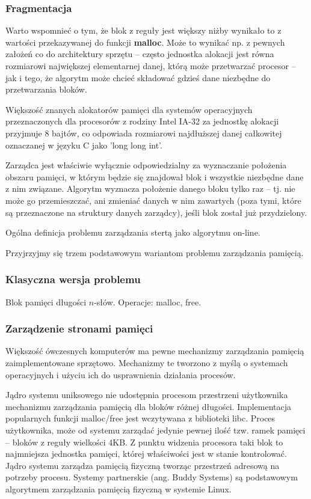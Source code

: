 \documentclass[12pt,a4paper,titlepage,twoside]{mwart}
\begin{document}
\subsubsection{Fragmentacja}

Warto wspomnieć o tym, że blok z reguły jest większy niżby wynikało to z
wartości przekazywanej do funkcji \textbf{malloc}.  Może to wynikać np. z
pewnych założeń co do architektury sprzętu -- często jednostka alokacji jest
równa rozmiarowi największej elementarnej danej, którą może przetwarzać
procesor -- jak i tego, że algorytm może chcieć składować gdzieś dane niezbędne
do przetwarzania bloków.

Większość znanych alokatorów pamięci dla systemów operacyjnych przeznaczonych
dla procesorów z rodziny Intel IA-32 za jednostkę alokacji przyjmuje 8 bajtów,
co odpowiada rozmiarowi najdłuższej danej całkowitej oznaczanej w języku C jako
'long long int'.

Zarządca jest właściwie wyłącznie odpowiedzialny za wyznaczanie położenia
obszaru pamięci, w którym będzie się znajdował blok i wszystkie niezbędne dane
z nim związane. Algorytm wyznacza położenie danego bloku tylko raz -- tj. nie
może go przemieszczać, ani zmieniać danych w nim zawartych (poza tymi, które są
przeznaczone na struktury danych zarządcy), jeśli blok został już przydzielony.



Ogólna definicja problemu zarządzania stertą jako algorytmu on-line.

Przyjrzyjmy się trzem podstawowym wariantom problemu zarządzania pamięcią.

\subsubsection{Klasyczna wersja problemu}

Blok pamięci długości $n$-słów. Operacje: malloc, free.

\subsubsection{Zarządzenie stronami pamięci}

Większość ówczesnych komputerów ma pewne mechanizmy zarządzania pamięcią
zaimplementowane sprzętowo. Mechanizmy te tworzono z myślą o systemach
operacyjnych i użyciu ich do usprawnienia działania procesów.

Jądro systemu uniksowego nie udostępnia procesom przestrzeni użytkownika
mechanizmu zarządzania pamięcią dla bloków różnej długości. Implementacja
popularnych funkcji malloc/free jest wczytywana z biblioteki libc. Proces
użytkownika, może od systemu zarządać jedynie pewnej ilość tzw. ramek pamięci
-- bloków z reguły wielkości 4KB. Z punktu widzenia procesora taki blok to
najmniejsza jednostka pamięci, której właściwości jest w stanie kontrolować.
Jądro systemu zarządza pamięcią fizyczną tworząc przestrzeń adresową na
potrzeby procesu. Systemy partnerskie (ang. Buddy Systems) są podstawowym
algorytmem zarządzania pamięcią fizyczną w systemie Linux.
\end{document}
